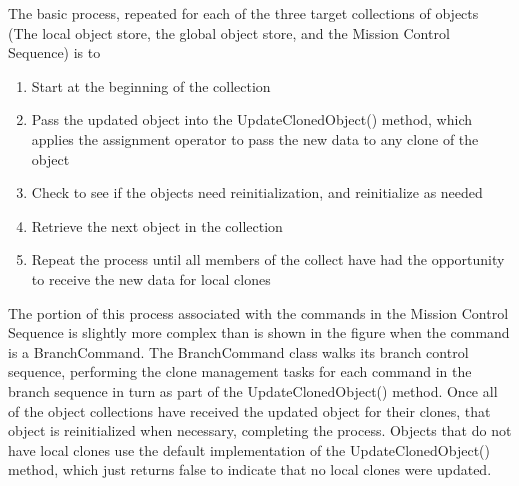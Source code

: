 \documentclass[10pt,letterpaper]{article}
\begin{document}
\noindent The basic process, repeated for each of the three target collections of objects (The local object store, the global object store, and the Mission Control Sequence) is to

\begin{enumerate}
\item Start at the beginning of the collection
\item Pass the updated object into the UpdateClonedObject() method, which applies the assignment operator to pass the new data to any clone of the object
\item Check to see if the objects need reinitialization, and reinitialize as needed
\item Retrieve the next object in the collection
\item Repeat the process until all members of the collect have had the opportunity to receive the new data for local clones
\end{enumerate}

\noindent The portion of this process associated with the commands in the Mission Control Sequence is slightly more complex than is shown in the figure when the command is a BranchCommand.  The BranchCommand class walks its branch control sequence, performing the clone management tasks for each command in the branch sequence in turn as part of the UpdateClonedObject() method.  Once all of the object collections have received the updated object for their clones, that object is reinitialized when necessary, completing the process.  Objects that do not have local clones use the default implementation of the UpdateClonedObject() method, which just returns false to indicate that no local clones were updated.
\end{document}
